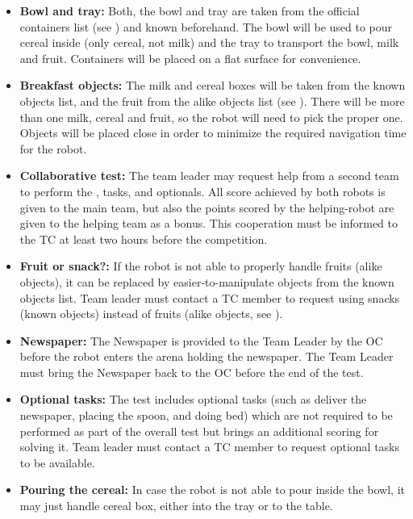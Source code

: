 \begin{itemize}
	\item \textbf{Bowl and tray:} Both, the bowl and tray are taken from the official containers list (see ) and known beforehand. The bowl will be used to pour cereal inside (only cereal, not milk) and the tray to transport the bowl, milk and fruit. Containers will be placed on a flat surface for convenience.

	\item \textbf{Breakfast objects:} The milk and cereal boxes will be taken from the known objects list, and the fruit from the alike objects list (see ). There will be more than one milk, cereal and fruit, so the robot will need to pick the proper one. Objects will be placed close in order to minimize the required navigation time for the robot.

	\item \textbf{Collaborative test:} The team leader may request help from a second team to perform the ,  tasks, and  optionals. All score achieved by both robots is given to the main team, but also the points scored by the helping-robot are given to the helping team as a bonus. This cooperation must be informed to the TC at least two hours before the competition.

	\item \textbf{Fruit or snack?:} If the robot is not able to properly handle fruits (alike objects), it can be replaced by easier-to-manipulate objects from the known objects list. Team leader must contact a TC member to request using snacks (known objects) instead of fruits (alike objects, see ).

	\item \textbf{Newspaper:} The Newspaper is provided to the Team Leader by the OC before the robot enters the arena holding the newspaper. The Team Leader must bring the Newspaper back to the OC before the end of the test.

	\item \textbf{Optional tasks:} The test includes optional tasks (such as deliver the newspaper, placing the spoon, and doing bed) which are not required to be performed as part of the overall test but brings an additional scoring for solving it. Team leader must contact a TC member to request optional tasks to be available.

	\item \textbf{Pouring the cereal:} In case the robot is not able to pour inside the bowl, it may just handle cereal box, either into the tray or to the table.


\end{itemize}
